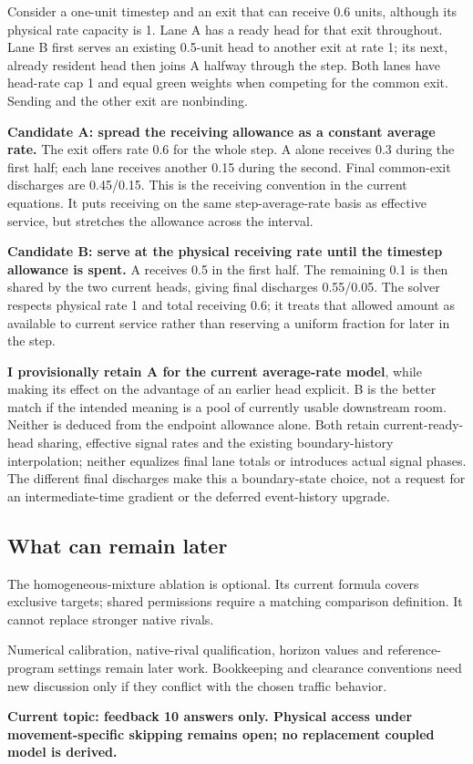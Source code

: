 \documentclass[11pt,a4paper]{article}
\begin{document}
Consider a one-unit timestep and an exit that can receive 0.6 units, although its physical rate capacity is 1. Lane A has a ready head for that exit throughout. Lane B first serves an existing 0.5-unit head to another exit at rate 1; its next, already resident head then joins A halfway through the step. Both lanes have head-rate cap 1 and equal green weights when competing for the common exit. Sending and the other exit are nonbinding.

\textbf{Candidate A: spread the receiving allowance as a constant average rate.} The exit offers rate 0.6 for the whole step. A alone receives 0.3 during the first half; each lane receives another 0.15 during the second. Final common-exit discharges are 0.45/0.15. This is the receiving convention in the current equations. It puts receiving on the same step-average-rate basis as effective service, but stretches the allowance across the interval.

\textbf{Candidate B: serve at the physical receiving rate until the timestep allowance is spent.} A receives 0.5 in the first half. The remaining 0.1 is then shared by the two current heads, giving final discharges 0.55/0.05. The solver respects physical rate 1 and total receiving 0.6; it treats that allowed amount as available to current service rather than reserving a uniform fraction for later in the step.

\textbf{I provisionally retain A for the current average-rate model}, while making its effect on the advantage of an earlier head explicit. B is the better match if the intended meaning is a pool of currently usable downstream room. Neither is deduced from the endpoint allowance alone. Both retain current-ready-head sharing, effective signal rates and the existing boundary-history interpolation; neither equalizes final lane totals or introduces actual signal phases. The different final discharges make this a boundary-state choice, not a request for an intermediate-time gradient or the deferred event-history upgrade.

\subsection*{What can remain later}

The homogeneous-mixture ablation is optional. Its current formula covers exclusive targets; shared permissions require a matching comparison definition. It cannot replace stronger native rivals.

Numerical calibration, native-rival qualification, horizon values and reference-program settings remain later work. Bookkeeping and clearance conventions need new discussion only if they conflict with the chosen traffic behavior.

\textbf{Current topic: feedback 10 answers only. Physical access under movement-specific skipping remains open; no replacement coupled model is derived.}
\end{document}
